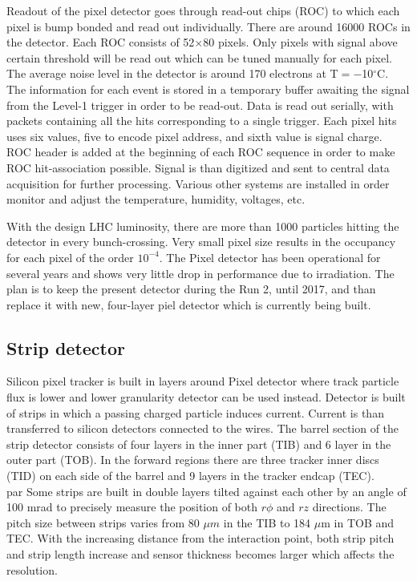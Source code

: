 \par Readout of the pixel detector goes through read-out chips (ROC) to which each pixel is bump bonded and read out individually. There are around 16000 ROCs in the detector. Each ROC consists of 52$\times$80 pixels. Only pixels with signal above certain threshold will be read out which can be tuned manually for each pixel. The average noise level in the detector is around 170 electrons at T$=-$10$^\circ$C. The information for each event is stored in a temporary buffer awaiting the signal from the Level-1 trigger in order to be read-out. Data is read out serially, with packets containing all the hits corresponding to a single trigger. Each pixel hits uses six values, five to encode pixel address, and sixth value is signal charge. ROC header is added at the beginning of each ROC sequence in order to make ROC hit-association possible. Signal is than digitized and sent to central data acquisition for further processing. Various other systems are installed in order monitor and adjust the temperature, humidity, voltages, etc. 
\par With the design LHC luminosity, there are more than 1000 particles hitting the detector in every bunch-crossing. Very small pixel size results in the occupancy for each pixel of the order $10^{-4}$. The Pixel detector has been operational for several years and shows very little drop in performance due to irradiation. The plan is to keep the present detector during the Run 2, until 2017, and than replace it with new, four-layer piel detector which is currently being built.


\subsection{Strip detector}

Silicon pixel tracker is built in layers around Pixel detector where track particle flux is lower and lower granularity detector can be used instead. Detector is built of strips in which a passing charged particle induces current. Current is than transferred to silicon detectors connected to the wires. The barrel section of the strip detector consists of four layers in the inner part (TIB) and 6 layer in the outer part (TOB). In the forward regions there are three tracker inner discs (TID) on each side of the barrel and 9 layers in the tracker endcap (TEC). 
\\par Some strips are built in double layers tilted against each other by an angle of 100 mrad to precisely measure the position of both $r\phi$ and $rz$ directions. The pitch size between strips varies from 80 $\mu m$ in the TIB to 184 $\mu$m in TOB and TEC. With the increasing distance from the interaction point, both strip pitch and strip length increase and sensor thickness becomes larger which affects the resolution.    

